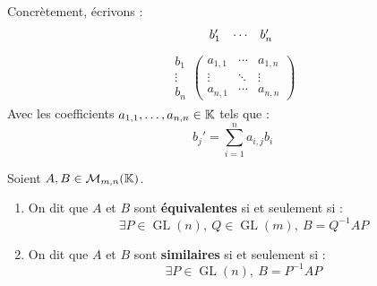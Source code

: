 \par \noindent Concrètement, écrivons : 
\begin{align*}
    \hspace{0.45cm}
    \begin{matrix}
        b_1' & \cdots & b_n' 
    \end{matrix}
\end{align*}
\vspace{-1.1cm}
\begin{align*}
    \begin{matrix}
        b_1 \\
        \vdots \\ 
        b_n
    \end{matrix}
    \begin{pmatrix}
        a_{1,1} & \cdots & a_{1,n} \\
        \vdots & \ddots & \vdots \\ 
        a_{n,1} & \cdots & a_{n,n}
    \end{pmatrix}
\end{align*}
Avec les coefficients $a_{1,1}, \ldots, a_{n,n} \in \mathbb{K}$ tels que :
\[ b_j' = \sum_{i=1}^{n} a_{i,j} b_i  \]

\begin{definition}
    Soient $A, B \in \mathcal{M}_{m,n}(\mathbb{K})$.
    \begin{enumerate}
        \item On dit que $A$ et $B$ sont \textbf{équivalentes} si et seulement si : 
        \[ \exists P \in \operatorname{GL}(n),\ Q \in \operatorname{GL}(m),\ B = Q^{-1} A P \]
        \item On dit que $A$ et $B$ sont \textbf{similaires} si et seulement si :
        \[ \exists P \in \operatorname{GL}(n),\ B = P^{-1} A P \]
    \end{enumerate}
\end{definition}

